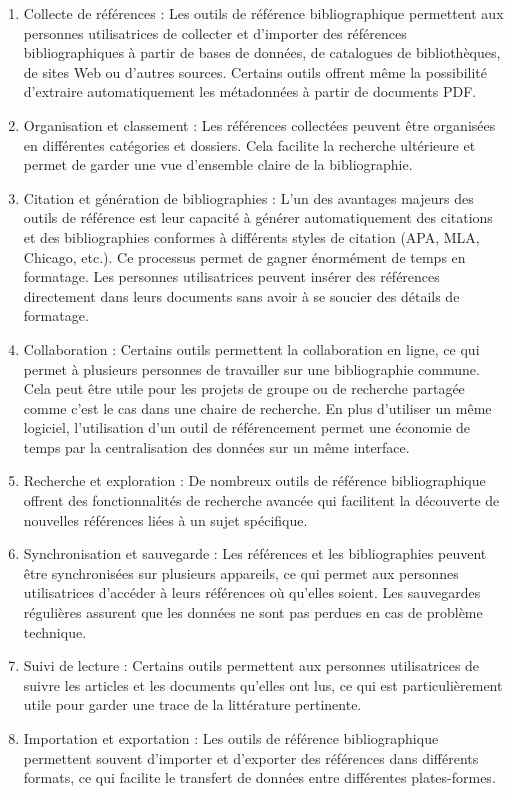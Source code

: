 \documentclass[
  letterpaper,
]{scrbook}
\begin{document}
\begin{enumerate}
\def\labelenumi{\arabic{enumi}.}
\item
  Collecte de références : Les outils de référence bibliographique
  permettent aux personnes utilisatrices de collecter et d'importer des
  références bibliographiques à partir de bases de données, de
  catalogues de bibliothèques, de sites Web ou d'autres sources.
  Certains outils offrent même la possibilité d'extraire automatiquement
  les métadonnées à partir de documents PDF.
\item
  Organisation et classement : Les références collectées peuvent être
  organisées en différentes catégories et dossiers. Cela facilite la
  recherche ultérieure et permet de garder une vue d'ensemble claire de
  la bibliographie.
\item
  Citation et génération de bibliographies : L'un des avantages majeurs
  des outils de référence est leur capacité à générer automatiquement
  des citations et des bibliographies conformes à différents styles de
  citation (APA, MLA, Chicago, etc.). Ce processus permet de gagner
  énormément de temps en formatage. Les personnes utilisatrices peuvent
  insérer des références directement dans leurs documents sans avoir à
  se soucier des détails de formatage.
\item
  Collaboration : Certains outils permettent la collaboration en ligne,
  ce qui permet à plusieurs personnes de travailler sur une
  bibliographie commune. Cela peut être utile pour les projets de groupe
  ou de recherche partagée comme c'est le cas dans une chaire de
  recherche. En plus d'utiliser un même logiciel, l'utilisation d'un
  outil de référencement permet une économie de temps par la
  centralisation des données sur un même interface.
\item
  Recherche et exploration : De nombreux outils de référence
  bibliographique offrent des fonctionnalités de recherche avancée qui
  facilitent la découverte de nouvelles références liées à un sujet
  spécifique.
\item
  Synchronisation et sauvegarde : Les références et les bibliographies
  peuvent être synchronisées sur plusieurs appareils, ce qui permet aux
  personnes utilisatrices d'accéder à leurs références où qu'elles
  soient. Les sauvegardes régulières assurent que les données ne sont
  pas perdues en cas de problème technique.
\item
  Suivi de lecture : Certains outils permettent aux personnes
  utilisatrices de suivre les articles et les documents qu'elles ont
  lus, ce qui est particulièrement utile pour garder une trace de la
  littérature pertinente.
\item
  Importation et exportation : Les outils de référence bibliographique
  permettent souvent d'importer et d'exporter des références dans
  différents formats, ce qui facilite le transfert de données entre
  différentes plates-formes.
\end{enumerate}
\end{document}
